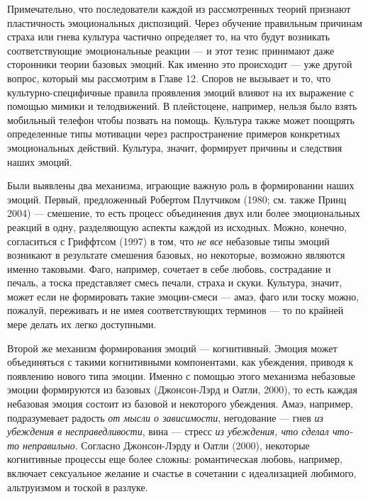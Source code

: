 \documentclass[11pt]{book}
\begin{document}
Примечательно, что последователи каждой из рассмотренных теорий признают пластичность эмоциональных диспозиций. Через обучение правильным причинам страха или гнева культура частично определяет то, на что будут возникать соответствующие эмоциональные реакции --- и этот тезис принимают даже сторонники теории базовых эмоций. Как именно это происходит --- уже другой вопрос, который мы рассмотрим в Главе 12. Споров не вызывает и то, что культурно-специфичные правила проявления эмоций влияют на их выражение с помощью мимики и телодвижений. В плейстоцене, например, нельзя было взять мобильный телефон чтобы позвать на помощь. Культура также может поощрять определенные типы мотивации через распространение примеров конкретных эмоциональных действий. Культура, значит, формирует причины и следствия наших эмоций.

Были выявлены два механизма, играющие важную роль в формировании наших эмоций. Первый, предложенный Робертом Плутчиком (1980; см. также Принц 2004) --- смешение, то есть процесс объединения двух или более эмоциональных реакций в одну, разделяющую аспекты каждой из исходных. Можно, конечно, согласиться с Гриффтсом (1997) в том, что \textit{не все} небазовые типы эмоций возникают в результате смешения базовых, но некоторые, возможно являются именно таковыми. Фаго, например, сочетает в себе любовь, сострадание и печаль, а тоска представляет смесь печали, страха и скуки. Культура, значит, может если не формировать такие эмоции-смеси --- амаэ, фаго или тоску можно, пожалуй, переживать и не имея соответствующих терминов --- то по крайней мере делать их легко доступными.

Второй же механизм формирования эмоций --- когнитивный. Эмоция может объединяться с такими когнитивными компонентами, как убеждения, приводя к появлению нового типа эмоции. Именно с помощью этого механизма небазовые эмоции формируются из базовых (Джонсон-Лэрд и Оатли, 2000), то есть каждая небазовая эмоция состоит из базовой и некоторого убеждения. Амаэ, например, подразумевает радость \textit{от мысли о зависимости}, негодование --- гнев \textit{из убеждения в несправедливости}, вина --- стресс \textit{из убеждения, что сделал что-то неправильно}. Согласно Джонсон-Лэрду и Оатли (2000), некоторые когнитивные процессы еще более сложны: романтическая любовь, например, включает сексуальное желание и счастье в сочетании с идеализацией любимого, альтруизмом и тоской в разлуке.
\end{document}
